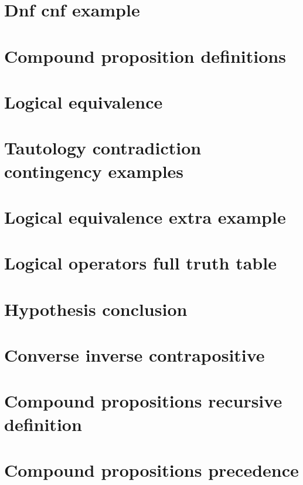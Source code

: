 \section*{Dnf cnf example}

\vfill
\section*{Compound proposition definitions}

\vfill
\section*{Logical equivalence}

\vfill
\section*{Tautology contradiction contingency examples}

\vfill
\section*{Logical equivalence extra example}

\vfill
\section*{Logical operators full truth table}

\vfill
\section*{Hypothesis conclusion}

\vfill
\section*{Converse inverse contrapositive}

\vfill
\section*{Compound propositions recursive definition}

\vfill
\section*{Compound propositions precedence}

\vfill
